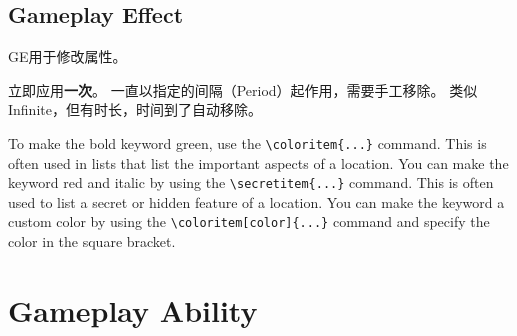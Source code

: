 \documentclass[
]{dragonbane-supplement}
\begin{document}
\section{Gameplay Effect}
\begin{segment}
GE用于修改属性。
\begin{itemize}
    	\begin{itemize}
    	立即应用\textbf{一次}。
    	一直以指定的间隔（Period）起作用，需要手工移除。
    	类似Infinite，但有时长，时间到了自动移除。
    	\end{itemize}
     To make the bold keyword green, use the \texttt{\textbackslash coloritem\{...\}} command. This is often used in lists that list the important aspects of a location.
     You can make the keyword red and italic by using the \texttt{\textbackslash secretitem\{...\}} command. This is often used to list a secret or hidden feature of a location.
      You can make the keyword a custom color by using the \texttt{\textbackslash coloritem[color]\{...\}} command and specify the color in the square bracket.
\end{itemize}
\chapter{Gameplay Ability}
\begin{lstlisting}[style=styleCXX]

\end{lstlisting}
\end{segment}
\end{document}
